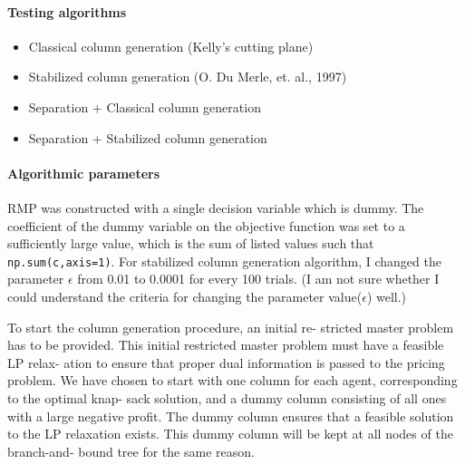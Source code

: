 \documentclass[12pt]{article}
\begin{document}
\paragraph{Testing algorithms}
\begin{itemize}
	\item Classical column generation (Kelly's cutting plane)
	\item Stabilized column generation (O. Du Merle, et. al., 1997)
	\item Separation + Classical column generation
	\item Separation + Stabilized column generation
\end{itemize}


\paragraph{Algorithmic parameters}

RMP was constructed with a single decision variable which is dummy. The coefficient of the dummy variable on the objective function was set to a sufficiently large value, which is the sum of listed values such that \verb|np.sum(c,axis=1)|. For stabilized column generation algorithm, I changed the parameter $\epsilon$ from 0.01 to 0.0001 for every 100 trials. (I am not sure whether I could understand the criteria for changing the parameter value($\epsilon$) well.)


 To start the column generation procedure, an initial re-
stricted master problem has to be provided. This initial
restricted master problem must have a feasible LP relax-
ation to ensure that proper dual information is passed to
the pricing problem. We have chosen to start with one
column for each agent, corresponding to the optimal knap-
sack solution, and a dummy column consisting of all ones
with a large negative profit. The dummy column ensures
that a feasible solution to the LP relaxation exists. This
dummy column will be kept at all nodes of the branch-and-
bound tree for the same reason.
\end{document}
